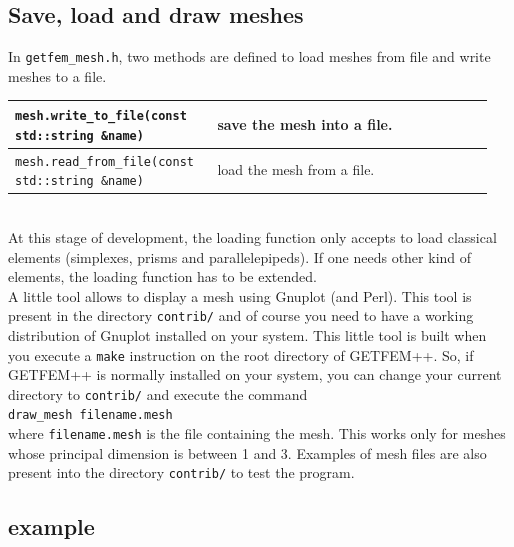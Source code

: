 \documentclass[11pt,a4paper]{article}
\begin{document}
\subsection{Save, load and draw meshes}

In {\tt getfem\_mesh.h}, two methods are defined to load meshes from file and write meshes to a file. \\[0.5cm]
\begin{tabular}{|m{0.4\linewidth}|m{0.55\linewidth}|}\hline

  {\tt mesh.write\_to\_file(const std::string \&name)} & save the mesh into a file.\\ \hline

  {\tt mesh.read\_from\_file(const std::string \&name)} & load the mesh from a file.\\ \hline

\end{tabular} \\[0.5cm]
At this stage of development, the loading function only accepts to load classical elements (simplexes, prisms and parallelepipeds). If one needs other kind of elements, the loading function has to be extended.  \\[0.5cm]

A little tool allows to display a mesh using Gnuplot (and Perl). This tool is present in the directory {\tt contrib/} and of course you need to have a working distribution of Gnuplot installed on your system. This little tool is built when you execute a {\tt make} instruction on the root directory of GETFEM++. So, if GETFEM++ is normally installed on your system, you can change your current directory to {\tt contrib/} and execute the command \\[0.5cm]
{\tt draw\_mesh filename.mesh} \\[0.5cm]
where {\tt filename.mesh} is the file containing the mesh. This works only for meshes whose principal dimension is between 1 and 3. Examples of mesh files are also present into the directory {\tt contrib/} to test the program.

\subsection{example}
\end{document}
